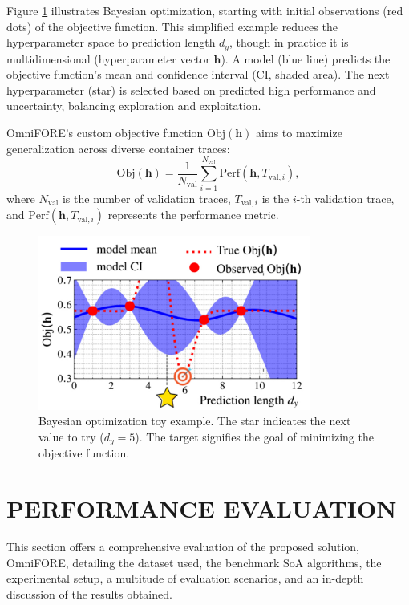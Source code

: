 \documentclass{ieeetmlcn}
\begin{document}
Figure \ref{fig:gp_toy_example} illustrates Bayesian optimization, starting with initial observations (red dots) of the objective function. This simplified example reduces the hyperparameter space to prediction length $d_y$, though in practice it is multidimensional (hyperparameter vector $\mathbf{h}$). A model (blue line) predicts the objective function's mean and confidence interval (CI, shaded area). The next hyperparameter (star) is selected based on predicted high performance and uncertainty, balancing exploration and exploitation.

OmniFORE's custom objective function $\text{Obj}(\mathbf{h})$ aims to maximize generalization across diverse container traces:
\begin{equation}
    \text{Obj}(\mathbf{h}) = \frac{1}{N_{\text{val}}} \sum_{i=1}^{N_{\text{val}}} \text{Perf}(\mathbf{h}, T_{\text{val}, i}),
\end{equation}
where $N_{\text{val}}$ is the number of validation traces, $T_{\text{val}, i}$ is the $i$-th validation trace, and $\text{Perf}(\mathbf{h}, T_{\text{val}, i})$ represents the performance metric.

\begin{figure}\centering
\centering
\centering\includegraphics[width=0.8\textwidth]{img/gp_toy_example.png}
\caption{Bayesian optimization toy example. The star indicates the next value to try ($d_y = 5$). The target signifies the goal of minimizing the objective function.}
\label{fig:gp_toy_example}
\end{figure}

\section{PERFORMANCE EVALUATION}
\label{sec: Performance Evaluation}

This section offers a comprehensive evaluation of the proposed solution, OmniFORE, detailing the dataset used, the benchmark SoA algorithms, the experimental setup, a multitude of evaluation scenarios, and an in-depth discussion of the results obtained.
\end{document}
